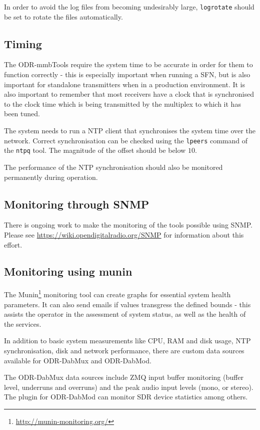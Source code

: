 
In order to avoid the log files from becoming undesirably large, \texttt{logrotate}
should be set to rotate the files automatically.



\subsection{Timing}
The ODR-mmbTools require the system time to be accurate in order for them to
function correctly - this is especially important when running a SFN, but is
also important for standalone transmitters when in a production environment. It
is also important to remember that most receivers have a clock that is
synchronised to the clock time which is being transmitted by the multiplex to
which it has been tuned.

The system needs to run a NTP client that synchronises the system time over the
network. Correct synchronisation can be checked using the \texttt{lpeers}
command of the \texttt{ntpq} tool. The magnitude of the offset should be below
$10$\ms.

The performance of the NTP synchronisation should also be monitored permanently
during operation.

\subsection{Monitoring through SNMP}
There is ongoing work to make the monitoring of the tools possible using SNMP.
Please see \url{https://wiki.opendigitalradio.org/SNMP} for information about
this effort.

\subsection{Monitoring using munin}
\label{monitmunin}
The Munin\footnote{\url{http://munin-monitoring.org/}} monitoring tool can
create graphs for essential system health parameters. It can also send emails
if values transgress the defined bounds - this assists the operator in the
assessment of system status, as well as the health of the services.

In addition to basic system measurements like CPU, RAM and disk usage, NTP
synchronisation, disk and network performance, there are custom data sources
available for ODR-DabMux and ODR-DabMod.

The ODR-DabMux data sources include ZMQ input buffer monitoring (buffer level,
underruns and overruns) and the peak audio input levels (mono, or stereo). The
plugin for ODR-DabMod can monitor SDR device statistics among others.

